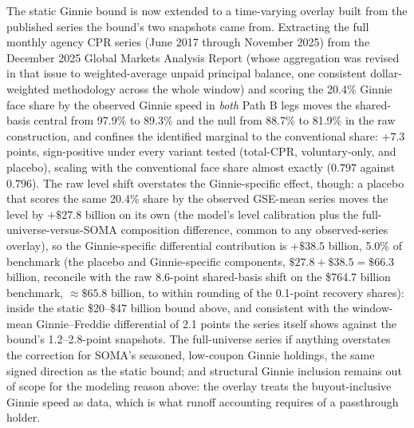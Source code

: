 \documentclass[12pt]{article}
\begin{document}
The static Ginnie bound is now extended to a time-varying overlay built from the published series the bound's two snapshots came from. Extracting the full monthly agency CPR series (June 2017 through November 2025) from the December 2025 Global Markets Analysis Report (whose aggregation was revised in that issue to weighted-average unpaid principal balance, one consistent dollar-weighted methodology across the whole window) and scoring the 20.4\% Ginnie face share by the observed Ginnie speed in \emph{both} Path B legs moves the shared-basis central from 97.9\% to 89.3\% and the null from 88.7\% to 81.9\% in the raw construction, and confines the identified marginal to the conventional share: $+7.3$ points, sign-positive under every variant tested (total-CPR, voluntary-only, and placebo), scaling with the conventional face share almost exactly ($0.797$ against $0.796$). The raw level shift overstates the Ginnie-specific effect, though: a placebo that scores the same 20.4\% share by the observed GSE-mean series moves the level by $+\$27.8$ billion on its own (the model's level calibration plus the full-universe-versus-SOMA composition difference, common to any observed-series overlay), so the Ginnie-specific differential contribution is $+\$38.5$ billion, 5.0\% of benchmark (the placebo and Ginnie-specific components, $\$27.8 + \$38.5 = \$66.3$ billion, reconcile with the raw 8.6-point shared-basis shift on the \$764.7 billion benchmark, $\approx\$65.8$ billion, to within rounding of the 0.1-point recovery shares): inside the static \$20--\$47 billion bound above, and consistent with the window-mean Ginnie--Freddie differential of 2.1 points the series itself shows against the bound's 1.2--2.8-point snapshots. The full-universe series if anything overstates the correction for SOMA's seasoned, low-coupon Ginnie holdings, the same signed direction as the static bound; and structural Ginnie inclusion remains out of scope for the modeling reason above: the overlay treats the buyout-inclusive Ginnie speed as data, which is what runoff accounting requires of a passthrough holder.
\end{document}

